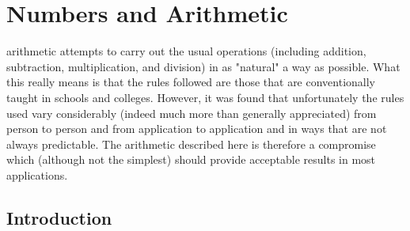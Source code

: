 \chapter{Numbers and Arithmetic}\label{refnums}
 \nr{} arithmetic attempts to carry out the usual operations
(including addition, subtraction, multiplication, and division) in as
"natural" a way as possible.
What this really means is that the rules followed are those that are
conventionally taught in schools and colleges.
However, it was found that unfortunately the rules used vary
considerably (indeed much more than generally appreciated) from person
to person and from application to application and in ways that are not
always predictable.
The \nr{} arithmetic described here is therefore a compromise which
(although not the simplest) should provide acceptable results in most
applications.
\section{Introduction}\label{arithintro}
 
